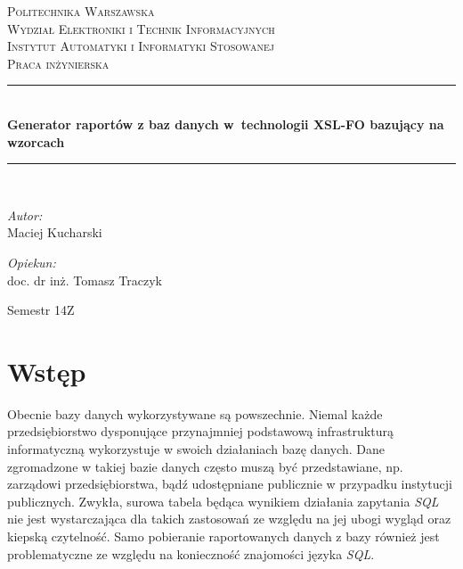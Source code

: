 \documentclass[11pt,a4paper]{article}
\newcommand{\HRule}{\rule{\linewidth}{0.5mm}}
\begin{document}
\begin{titlepage}
\begin{center}
\textsc{\LARGE Politechnika Warszawska}\\[0.5cm]
\textsc{\Large Wydział Elektroniki i Technik Informacyjnych}\\
\textsc{\Large Instytut Automatyki i Informatyki Stosowanej}\\[1.5cm]

\textsc{\Large Praca inżynierska} \\[0.5cm]
\HRule \\[0.4cm]
{ \huge \bfseries Generator raportów z baz danych w~technologii XSL-FO  bazujący na wzorcach \\[0.4cm]}
\HRule \\[1.5cm]

\begin{minipage} {0.4\textwidth}
\begin{flushleft} \large
\emph{Autor:}\\
 Maciej Kucharski 
\end{flushleft}
\end{minipage}
\begin{minipage} {0.4\textwidth}
\begin{flushright} \large

\emph{Opiekun:}\\
doc. dr inż. Tomasz Traczyk

\end{flushright}
\end{minipage}	
\vfill
\large Semestr 14Z

	\end{center}
\end{titlepage}
 
\tableofcontents
\newpage

\section{Wstęp} \label{sec:wst}
Obecnie bazy danych wykorzystywane są powszechnie. Niemal każde przedsiębiorstwo dysponujące przynajmniej podstawową infrastrukturą informatyczną wykorzystuje w swoich działaniach bazę danych. Dane zgromadzone w takiej bazie danych często muszą być przedstawiane, np. zarządowi przedsiębiorstwa, bądź udostępniane publicznie w przypadku instytucji publicznych. Zwykła, surowa tabela będąca wynikiem działania zapytania \emph{SQL} nie jest wystarczająca dla takich zastosowań ze względu na jej ubogi wygląd oraz kiepską czytelność.  Samo pobieranie raportowanych danych z bazy również jest problematyczne ze względu na konieczność znajomości języka \emph{SQL}. 
\end{document}
